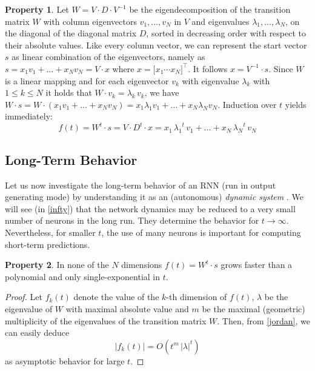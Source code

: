 \documentclass[twoside,11pt]{article}
\theoremstyle{definition}
\newtheorem{prop}{Property}
\begin{document}
\begin{prop}\label{eigen}
Let $W = V \cdot D \cdot V^{-1}$ be the eigendecomposition of the transition matrix $W$ with column
eigenvectors $v_1,\dots,v_N$ in $V$ and eigenvalues $\lambda_1, \dots, \lambda_N$,
on the diagonal of the diagonal matrix $D$, sorted in decreasing order with
respect to their absolute values. Like every column vector, we can represent the
start vector $s$ as linear combination of the eigenvectors, namely as $s =
x_1 v_1 + \dots + x_N v_N = V \cdot x$ where $x = \big[ x_1 \cdots x_N
\big]^\top$. It follows $x = V^{-1} \cdot s$.
Since $W$ is a linear mapping and for each eigenvector $v_k$ with eigenvalue
$\lambda_k$ with $1 \le k \le N$ it holds that $W \cdot v_k = \lambda_k\, v_k$, we
have $W \cdot s = W \cdot (x_1 v_1 + \dots + x_N v_N) = x_1 \lambda_1 v_1 +
\dots + x_N \lambda_N v_N$. Induction over $t$ yields immediately:
\begin{equation}\label{form}
	f(t) = W^t \cdot s = V \cdot D^t \cdot x =
	x_1\,{\lambda_1}^t\,v_1 + \dots + x_N\,{\lambda_N}^t\,v_N
\end{equation}
\end{prop}

\subsection{Long-Term Behavior}\label{ellipse}

Let us now investigate the long-term behavior of an RNN (run in output generating
mode) by understanding it as an (autonomous) \emph{dynamic system} \citep{CK14,Str15}.
We will see (in \cref{infty}) that the network dynamics may be reduced to a
very small number of neurons in the long run. They determine the behavior for $t
\to \infty$. Nevertheless, for smaller $t$, the use of many neurons is important
for computing short-term predictions.

\begin{prop}\label{exponential}
In none of the $N$ dimensions $f(t) = W^t \cdot s$ grows faster than a
polynomial and only single-exponential in $t$.
\end{prop}

\begin{proof}
Let $f_k(t)$ denote the value of the $k$-th dimension of $f(t)$, $\lambda$ be
the eigenvalue of $W$ with maximal absolute value and $m$ be the maximal (geometric)
multiplicity of the eigenvalues of the transition matrix $W$. Then, from
\cref{jordan}, we can easily deduce \[ |f_k(t)| = O(t^m\,|\lambda|^t) \]
as asymptotic behavior for large $t$.
\end{proof}
\end{document}

